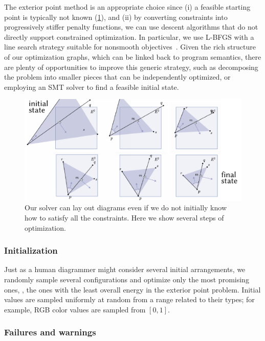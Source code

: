 The exterior point method is an appropriate choice since (i) a feasible starting point is typically not known (\cref{fig:OptimizationProgress}), and (ii) by converting constraints into progressively stiffer penalty functions, we can use descent algorithms that do not directly support constrained optimization. In particular, we use L-BFGS with a line search strategy suitable for nonsmooth objectives~\cite{Lewis:2009:NOB}.  Given the rich structure of our optimization graphs, which can be linked back to program semantics, there are plenty of opportunities to improve this generic strategy, such as decomposing the problem into smaller pieces that can be independently optimized, or employing an SMT solver to find a feasible initial state.

\begin{figure}[t]
   \centering
   \includegraphics[scale=1.5]{assets/penrose/OptimizationProgress.pdf}
   \caption{Our solver can lay out diagrams even if we do not initially know how to satisfy all the constraints. Here we show several steps of optimization.\label{fig:OptimizationProgress}}
\end{figure}

\subsubsection{Initialization}

Just as a human diagrammer might consider several initial arrangements, we randomly sample several configurations and optimize only the most promising ones, \ie, the ones with the least overall energy in the exterior point problem.  Initial values are sampled uniformly at random from a range related to their types; for example, RGB color values are sampled from \([0,1]\).

\subsubsection{Failures and warnings}

